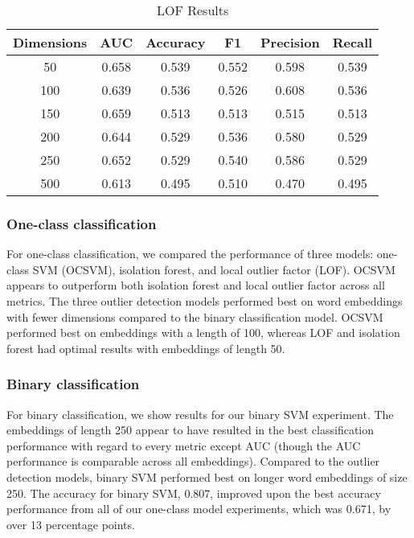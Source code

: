 \documentclass{article}
\begin{document}
\begin{table}
 \caption{LOF Results}
  \centering
  \begin{tabular}{|c|c|c|c|c|c|}
    \hline
    \rowcolor{lightgray} \textbf{Dimensions} & \textbf{AUC} & \textbf{Accuracy} & \textbf{F1} & \textbf{Precision} & \textbf{Recall} \\
    \hline
    \cellcolor{green} 50 & 0.658 & \cellcolor{green} 0.539 & \cellcolor{green} 0.552 & 0.598 & \cellcolor{green} 0.539 \\
    \hline
    100 & 0.639 & 0.536 & 0.526 & \cellcolor{green} 0.608 & 0.536 \\
    \hline
    150 & \cellcolor{green} 0.659 & 0.513 & 0.513 & 0.515 & 0.513 \\
    \hline
    200 & 0.644 & 0.529 & 0.536 & 0.580 & 0.529 \\
    \hline
    250 & 0.652 & 0.529 & 0.540 & 0.586 & 0.529 \\
    \hline
    500 & 0.613 & 0.495 & 0.510 & 0.470 & 0.495 \\
    \hline
  \end{tabular}
  \label{tab:lof}
\end{table}

\hypertarget{one-class-classification}{%
\subsubsection{One-class
classification}\label{one-class-classification}}

For one-class classification, we compared the performance of three
models: one-class SVM (OCSVM), isolation forest, and local outlier
factor (LOF). OCSVM appears to outperform both isolation forest and
local outlier factor across all metrics. The three outlier detection
models performed best on word embeddings with fewer dimensions compared
to the binary classification model. OCSVM performed best on embeddings
with a length of 100, whereas LOF and isolation forest had optimal
results with embeddings of length 50.

\hypertarget{binary-classification}{%
\subsubsection{Binary classification}\label{binary-classification}}

For binary classification, we show results for our binary SVM
experiment. The embeddings of length 250 appear to have resulted in the
best classification performance with regard to every metric except AUC
(though the AUC performance is comparable across all embeddings).
Compared to the outlier detection models, binary SVM performed best on
longer word embeddings of size 250. The accuracy for binary SVM, 0.807,
improved upon the best accuracy performance from all of our one-class
model experiments, which was 0.671, by over 13 percentage points.
\end{document}
